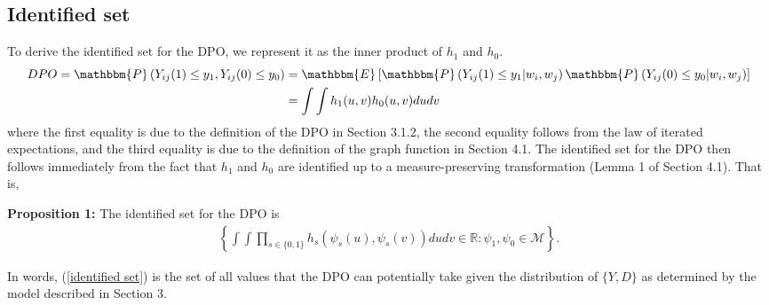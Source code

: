\documentclass[12pt]{article}
\theoremstyle{definition}
\begin{document}
\subsection{Identified set}
To derive the identified set for the DPO, we represent it as the inner product of $h_{1}$ and $h_{0}$.
\begin{align*}
DPO = \mathbbm{P}\left(Y_{ij}(1) \leq y_1, Y_{ij}(0) \leq y_0\right)
&= \mathbbm{E}\left[\mathbbm{P}\left(Y_{ij}(1) \leq y_1| w_i, w_j\right)\mathbbm{P}\left(Y_{ij}(0) \leq y_0| w_i, w_j\right)\right] \\
&= \int\int h_{1}(u,v)h_{0}(u,v)dudv
\end{align*}
where the first equality is due to the definition of the DPO in Section 3.1.2, the second equality follows from the law of iterated expectations, and the third equality is due to the definition of the graph function in Section 4.1. The identified set for the DPO then follows immediately from the fact that $h_1$ and $h_0$ are identified up to a measure-preserving transformation (Lemma 1 of Section 4.1). That is,  

\begin{flushleft}
\textbf{Proposition 1:} The identified set for the DPO is 
\begin{align}\label{identified set}
\left\{ \int\int \prod_{s \in \{0,1\}} h_{s}(\psi_s(u),\psi_s(v))dudv \in \mathbb{R} : \psi_1, \psi_0 \in \mathcal{M}\right\}. 
\end{align}
\end{flushleft}
In words, (\ref{identified set}) is the set of all values that the DPO can potentially take given the distribution of $\{Y,D\}$ as determined by the model described in Section 3.  
\end{document}
